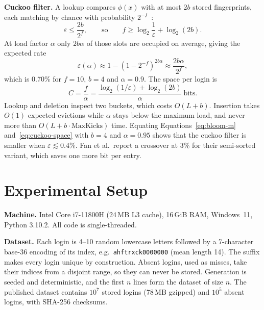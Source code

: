 \documentclass[acmsmall,nonacm]{acmart}
\newcommand{\code}[1]{\texttt{#1}}
\begin{document}
\textbf{Cuckoo filter.} A lookup compares $\phi(x)$ with at most $2b$ stored
fingerprints, each matching by chance with probability $2^{-f}$~\cite{fan2014}:
\begin{equation}
  \varepsilon \le \frac{2b}{2^f},
  \qquad\text{so}\qquad
  f \ge \log_2 \frac{1}{\varepsilon} + \log_2 (2b).
  \label{eq:cuckoo-bound}
\end{equation}
At load factor $\alpha$ only $2b\alpha$ of those slots are occupied on average,
giving the expected rate
\begin{equation}
  \varepsilon(\alpha) \approx 1 - \left(1 - 2^{-f}\right)^{2b\alpha} \approx \frac{2b\alpha}{2^f},
  \label{eq:cuckoo-expected}
\end{equation}
which is 0.70\% for $f = 10$, $b = 4$ and $\alpha = 0.9$. The space per login is
\begin{equation}
  C = \frac{f}{\alpha} = \frac{\log_2(1/\varepsilon) + \log_2(2b)}{\alpha}\ \text{bits.}
  \label{eq:cuckoo-space}
\end{equation}
Lookup and deletion inspect two buckets, which costs $O(L + b)$. Insertion takes
$O(1)$ expected evictions while $\alpha$ stays below the maximum load, and never
more than $O(L + b \cdot \mathrm{MaxKicks})$ time. Equating
Equations~\eqref{eq:bloom-m} and~\eqref{eq:cuckoo-space} with $b = 4$ and
$\alpha = 0.95$ shows that the cuckoo filter is smaller when
$\varepsilon \lesssim 0.4\%$. Fan et al.\ report a crossover at 3\% for their
semi-sorted variant, which saves one more bit per entry.

\section{Experimental Setup}
\label{sec:setup}

\textbf{Machine.} Intel Core i7-11800H (24\,MB L3 cache), 16\,GiB RAM,
Windows~11, Python 3.10.2. All code is single-threaded.

\textbf{Dataset.} Each login is 4--10 random lowercase letters followed by a
7-character base-36 encoding of its index, e.g.\ \code{ahftrxck0000000} (mean
length 14). The suffix makes every login unique by construction. Absent logins,
used as misses, take their indices from a disjoint range, so they can never be
stored. Generation is seeded and deterministic, and the first $n$ lines form the
dataset of size $n$. The published dataset contains $10^7$ stored logins (78\,MB
gzipped) and $10^5$ absent logins, with SHA-256 checksums.
\end{document}

